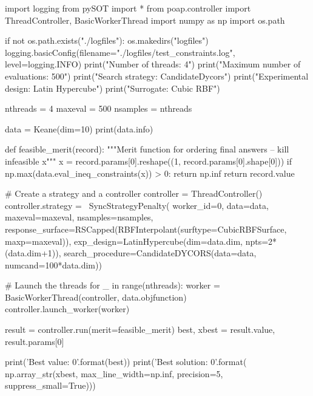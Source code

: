 \documentclass[]{article}
\begin{document}
\begin{python}
import logging
from pySOT import *
from poap.controller import ThreadController, BasicWorkerThread
import numpy as np
import os.path

if not os.path.exists("./logfiles"):
    os.makedirs("logfiles")
logging.basicConfig(filename="./logfiles/test_constraints.log",
                    level=logging.INFO)
print("Number of threads: 4")
print("Maximum number of evaluations: 500")
print("Search strategy: CandidateDycors")
print("Experimental design: Latin Hypercube")
print("Surrogate: Cubic RBF")

nthreads = 4
maxeval = 500
nsamples = nthreads

data = Keane(dim=10)
print(data.info)

def feasible_merit(record):
    """Merit function for ordering final answers -- kill infeasible x"""
    x = record.params[0].reshape((1, record.params[0].shape[0]))
    if np.max(data.eval_ineq_constraints(x)) > 0:
        return np.inf
    return record.value

# Create a strategy and a controller
controller = ThreadController()
controller.strategy = \
    SyncStrategyPenalty(
        worker_id=0, data=data,
        maxeval=maxeval, nsamples=nsamples,
        response_surface=RSCapped(RBFInterpolant(surftype=CubicRBFSurface,
                                                 maxp=maxeval)),
        exp_design=LatinHypercube(dim=data.dim, npts=2*(data.dim+1)),
        search_procedure=CandidateDYCORS(data=data, numcand=100*data.dim))

# Launch the threads
for _ in range(nthreads):
    worker = BasicWorkerThread(controller, data.objfunction)
    controller.launch_worker(worker)

result = controller.run(merit=feasible_merit)
best, xbest = result.value, result.params[0]

print('Best value: {0}'.format(best))
print('Best solution: {0}'.format(
    np.array_str(xbest, max_line_width=np.inf,
                 precision=5, suppress_small=True)))
\end{python}
\end{document}
